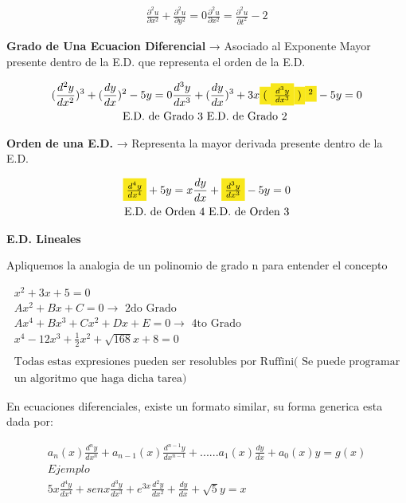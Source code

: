 \documentclass{article}
\begin{document}
\begin{gather*}
\frac{∂^{2}u}{∂x^{2}}+\frac{∂^{2}u}{∂y^{2}} = 0       \frac{∂^{2}u}{∂x^{2}}= \frac{∂^{2}u}{∂t^{2}} -2

\end{gather*}


\textbf{Grado de Una Ecuacion Diferencial} → Asociado al \colorbox[RGB]{248,231,28}{Exponente Mayor} presente dentro de la E.D. que representa el orden de la E.D.


\begin{gather*}
(\frac{d^{2}y}{dx^{2}})^{3} + (\frac{dy}{dx})^{2}  - 5y = 0           \frac{d^{3}y}{dx^{3}} + (\frac{dy}{dx})^{3} +3x\colorbox[RGB]{248,231,28}{$($}\colorbox[RGB]{248,231,28}{$\frac{d^{3}y}{dx^{3}}$}\colorbox[RGB]{248,231,28}{$)$}\colorbox[RGB]{248,231,28}{$^{2}$}- 5y = 0  \\
\text{E.D. de Grado 3                           E.D. de Grado 2                       }

\end{gather*}


\textbf{Orden de una E.D.} → Representa la mayor derivada presente dentro de la E.D.


\begin{gather*}
\colorbox[RGB]{248,231,28}{$\frac{d^{4}y}{dx^{4}}$}+5y=x                     \frac{dy}{dx}+ \colorbox[RGB]{248,231,28}{$\frac{d^{3}y}{dx^{3}}$} - 5y = 0  \\
\text{E.D. de Orden 4                        E.D. de Orden 3}

\end{gather*}




\textbf{E.D. Lineales}

Apliquemos la analogia de un polinomio de grado n para entender el concepto


\begin{gather*}
x^{2}+3x+5 = 0 \\
Ax^{2}+Bx+C = 0  \rightarrow \text{ 2do Grado} \\
Ax^{4}+Bx^{3}+Cx^{2}+Dx+E = 0  \rightarrow \text{ 4to Grado} \\
x^{4}-12x^{3}+\frac{1}{2}x^{2}+\sqrt{168}x+8 = 0 \\
 \\
\text{Todas estas expresiones pueden ser resolubles por Ruffini}(\text{ Se puede programar} \\
\text{un algoritmo que haga dicha tarea})

\end{gather*}


En ecuaciones diferenciales, existe un formato similar, su forma generica esta dada por:


\begin{gather*}
a_{n}(x)\frac{d^{n}y}{dx^{n}}+a_{n-1}(x)\frac{d^{n-1}y}{dx^{n-1}}+......a_{1}(x)\frac{dy}{dx}+ a_{0}(x)y = g(x) \\
Ejemplo \\
5x\frac{d^{4}y}{dx^{4}}+senx\frac{d^{3}y}{dx^{3}}+e^{3x}\frac{d^{2}y}{dx^{2}}+\frac{dy}{dx^{}} +\sqrt{5}y=x

\end{gather*}
\end{document}
